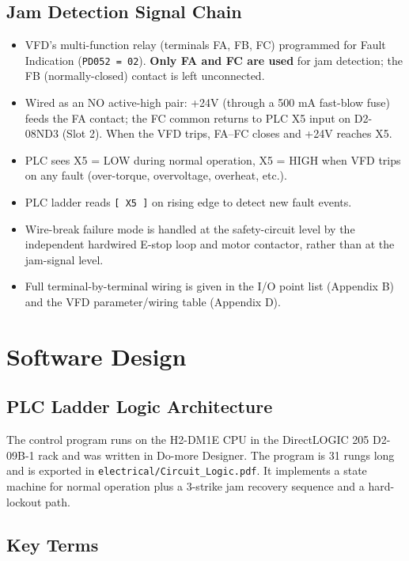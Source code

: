 \documentclass[hidelinks,12pt]{article}
\begin{document}
\subsection{Jam Detection Signal Chain}
\begin{itemize}
    \item VFD's multi-function relay (terminals FA, FB, FC) programmed for Fault Indication (\texttt{PD052 = 02}). \textbf{Only FA and FC are used} for jam detection; the FB (normally-closed) contact is left unconnected.
    \item Wired as an NO active-high pair: +24V (through a 500 mA fast-blow fuse) feeds the FA contact; the FC common returns to PLC X5 input on D2-08ND3 (Slot 2). When the VFD trips, FA--FC closes and +24V reaches X5.
    \item PLC sees X5 = LOW during normal operation, X5 = HIGH when VFD trips on any fault (over-torque, overvoltage, overheat, etc.).
    \item PLC ladder reads \texttt{[ X5 ]} on rising edge to detect new fault events.
    \item Wire-break failure mode is handled at the safety-circuit level by the independent hardwired E-stop loop and motor contactor, rather than at the jam-signal level.
    \item Full terminal-by-terminal wiring is given in the I/O point list (Appendix B) and the VFD parameter/wiring table (Appendix D).
\end{itemize}

\section{Software Design}

\subsection{PLC Ladder Logic Architecture}\label{sec:plcladder}

The control program runs on the H2-DM1E CPU in the DirectLOGIC 205 D2-09B-1 rack
and was written in Do-more Designer. The program is 31 rungs long and is exported
in \texttt{electrical/Circuit\_Logic.pdf}. It implements a state machine for normal
operation plus a 3-strike jam recovery sequence and a hard-lockout path.

\subsection*{Key Terms}
\end{document}
